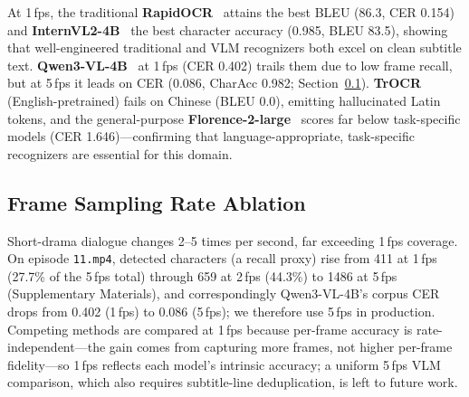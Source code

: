 \documentclass[mathematics,article,submit,xetex,moreauthors]{Definitions/mdpi}
\begin{document}
At 1\,fps, the traditional \textbf{RapidOCR}~\cite{rapidocr2022} attains the best BLEU (86.3, CER 0.154) and \textbf{InternVL2-4B}~\cite{chen2024internvl} the best character accuracy (0.985, BLEU 83.5), showing that well-engineered traditional and VLM recognizers both excel on clean subtitle text.
\textbf{Qwen3-VL-4B}~\cite{qwen3vl2025} at 1\,fps (CER 0.402) trails them due to low frame recall, but at 5\,fps it leads on CER (0.086, CharAcc 0.982; Section~\ref{sec:fps_ablation}).
\textbf{TrOCR}~\cite{li2021trocr} (English-pretrained) fails on Chinese (BLEU 0.0), emitting hallucinated Latin tokens, and the general-purpose \textbf{Florence-2-large}~\cite{florence2_2024} scores far below task-specific models (CER 1.646)---confirming that language-appropriate, task-specific recognizers are essential for this domain.

\subsection{Frame Sampling Rate Ablation}
\label{sec:fps_ablation}
Short-drama dialogue changes 2--5 times per second, far exceeding 1\,fps coverage.
On episode \texttt{11.mp4}, detected characters (a recall proxy) rise from 411 at 1\,fps (27.7\% of the 5\,fps total) through 659 at 2\,fps (44.3\%) to 1486 at 5\,fps (Supplementary Materials), and correspondingly Qwen3-VL-4B's corpus CER drops from 0.402 (1\,fps) to 0.086 (5\,fps); we therefore use 5\,fps in production.
Competing methods are compared at 1\,fps because per-frame accuracy is rate-independent---the gain comes from capturing more frames, not higher per-frame fidelity---so 1\,fps reflects each model's intrinsic accuracy; a uniform 5\,fps VLM comparison, which also requires subtitle-line deduplication, is left to future work.
\end{document}
